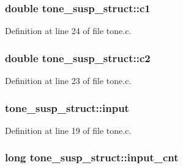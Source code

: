 \subsubsection[{\texorpdfstring{c1}{c1}}]{\setlength{\rightskip}{0pt plus 5cm}double tone\+\_\+susp\+\_\+struct\+::c1}\hypertarget{structtone__susp__struct_aa1dad4f3359dc279d36a1c4865ec37fa}{}\label{structtone__susp__struct_aa1dad4f3359dc279d36a1c4865ec37fa}


Definition at line 24 of file tone.\+c.

\subsubsection[{\texorpdfstring{c2}{c2}}]{\setlength{\rightskip}{0pt plus 5cm}double tone\+\_\+susp\+\_\+struct\+::c2}\hypertarget{structtone__susp__struct_ae7917c4bc157cf5f94cd31950ece592a}{}\label{structtone__susp__struct_ae7917c4bc157cf5f94cd31950ece592a}


Definition at line 23 of file tone.\+c.

\subsubsection[{\texorpdfstring{input}{input}}]{ tone\+\_\+susp\+\_\+struct\+::input}\hypertarget{structtone__susp__struct_a7db6f4f59673a34d12848bf704c7718a}{}\label{structtone__susp__struct_a7db6f4f59673a34d12848bf704c7718a}


Definition at line 19 of file tone.\+c.

\subsubsection[{\texorpdfstring{input\+\_\+cnt}{input_cnt}}]{\setlength{\rightskip}{0pt plus 5cm}long tone\+\_\+susp\+\_\+struct\+::input\+\_\+cnt}\hypertarget{structtone__susp__struct_a54e97a7efc43c1f7c2b63f0669950c11}{}\label{structtone__susp__struct_a54e97a7efc43c1f7c2b63f0669950c11}


